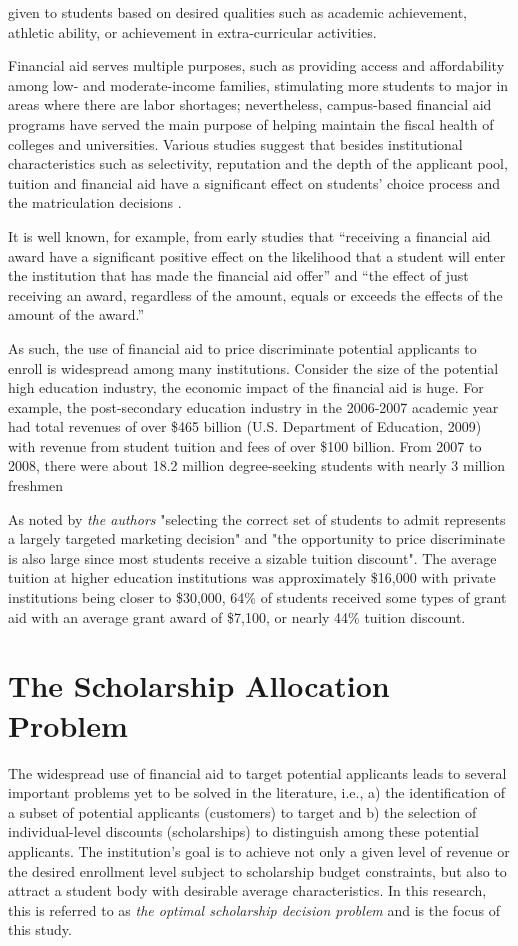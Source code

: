 \documentclass[12pt,english]{report}
\begin{document}
given to students based on desired qualities such as academic achievement, 
athletic ability,  or achievement in extra-curricular activities.

Financial aid serves multiple purposes, such as providing access and
affordability among low- and moderate-income families, stimulating more
students to major in areas where there are labor shortages; nevertheless,
campus-based financial aid programs have served the main purpose of helping
maintain the fiscal health of colleges and universities. Various studies
suggest that besides institutional characteristics such as selectivity,
reputation and the depth of the applicant pool, tuition and financial aid have
a significant effect on students' choice process and the matriculation
decisions \citep{Fulleri2014}.

It is well known, for example, from early studies \citep{Heller1997,
Leslie1988} that ``receiving a financial aid award have a significant positive
effect on the likelihood that a student will enter the institution that has
made the financial aid offer'' and ``the effect of just receiving an award,
regardless of the amount, equals or exceeds the effects of the amount of the
award.''

As such, the use of financial aid to price discriminate potential applicants to
enroll is widespread among many institutions.   Consider the size of the
potential high education industry, the economic impact of the financial aid is
huge. For example, the post-secondary education industry in the 2006-2007
academic year had total revenues of over \$465 billion (U.S. Department of
Education, 2009) with revenue from student tuition and fees of over \$100
billion.  From 2007 to 2008, there were about 18.2 million degree-seeking
students with nearly 3 million freshmen\citep{Belloni2012}

As noted by \textit{the authors}  "selecting the correct set of students to
admit represents a largely targeted marketing decision" and "the opportunity to
price discriminate is also large since most students receive a sizable tuition
discount".  The average tuition at higher education institutions was
approximately \$16,000 with private institutions being closer to \$30,000, 64\%
of students received some types of grant aid with an average grant award of
\$7,100, or nearly 44\% tuition discount.

\section{The Scholarship Allocation Problem}
The widespread use of financial aid to target potential applicants leads to
several important problems yet to be solved in the literature, i.e., a) the
identification of a subset of potential applicants (customers) to target and b)
the selection of individual-level discounts (scholarships) to distinguish among
these 
potential applicants.  The institution's goal is to achieve not only a given
level of 
revenue  or the desired enrollment level subject to scholarship budget
constraints, but also to attract a student body with desirable average
characteristics. In this research, this is referred to as \textit{the optimal
scholarship decision problem} and is the focus of this study.
\end{document}
